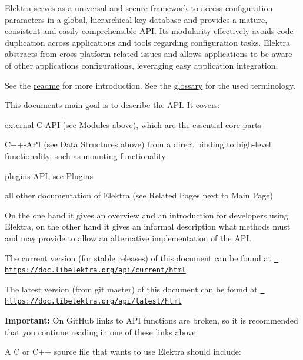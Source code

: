 Elektra serves as a universal and secure framework to access configuration parameters in a global, hierarchical key database and provides a mature, consistent and easily comprehensible A\+PI. Its modularity effectively avoids code duplication across applications and tools regarding configuration tasks. Elektra abstracts from cross-\/platform-\/related issues and allows applications to be aware of other applications\textquotesingle{} configurations, leveraging easy application integration.

See the \mbox{\hyperlink{README_md}{readme}} for more introduction. See the \mbox{\hyperlink{doc_help_elektra-glossary_md}{glossary}} for the used terminology.

This document\textquotesingle{}s main goal is to describe the A\+PI. It covers\+:


\begin{DoxyItemize}
\item external C-\/\+A\+PI (see Modules above), which are the essential core parts
\item C++-\/\+A\+PI (see Data Structures above) from a direct binding to high-\/level functionality, such as mounting functionality
\item plugins A\+PI, see Plugins
\item all other documentation of Elektra (see Related Pages next to Main Page)
\end{DoxyItemize}

On the one hand it gives an overview and an introduction for developers using Elektra, on the other hand it gives an informal description what methods must and may provide to allow an alternative implementation of the A\+PI.

The current version (for stable releases) of this document can be found at \href{https://doc.libelektra.org/api/current/html}{\texttt{ https\+://doc.\+libelektra.\+org/api/current/html}}

The latest version (from git master) of this document can be found at \href{https://doc.libelektra.org/api/latest/html}{\texttt{ https\+://doc.\+libelektra.\+org/api/latest/html}}

{\bfseries{Important\+:}} On Git\+Hub links to A\+PI functions are broken, so it is recommended that you continue reading in one of these links above.

A C or C++ source file that wants to use Elektra should include\+:


\begin{DoxyCode}{0}
\DoxyCodeLine{\textcolor{preprocessor}{\#include <kdb.h>}}
\end{DoxyCode}


